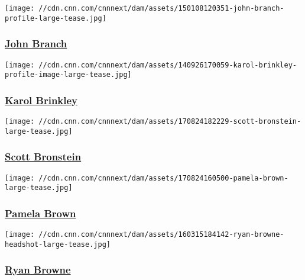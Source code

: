 \href{/profiles/john-branch}{}

\texttt{[image: //cdn.cnn.com/cnnnext/dam/assets/150108120351-john-branch-profile-large-tease.jpg]}

\hypertarget{john-branch}{%
\subsubsection{\texorpdfstring{\href{/profiles/john-branch}{John
Branch}}{John Branch}}\label{john-branch}}

\href{/profiles/karol-brinkley-profile}{}

\texttt{[image: //cdn.cnn.com/cnnnext/dam/assets/140926170059-karol-brinkley-profile-image-large-tease.jpg]}

\hypertarget{karol-brinkley}{%
\subsubsection{\texorpdfstring{\href{/profiles/karol-brinkley-profile}{Karol
Brinkley}}{Karol Brinkley}}\label{karol-brinkley}}

\href{/profiles/scott-bronstein}{}

\texttt{[image: //cdn.cnn.com/cnnnext/dam/assets/170824182229-scott-bronstein-large-tease.jpg]}

\hypertarget{scott-bronstein}{%
\subsubsection{\texorpdfstring{\href{/profiles/scott-bronstein}{Scott
Bronstein}}{Scott Bronstein}}\label{scott-bronstein}}

\href{/profiles/pamela-brown-profile}{}

\texttt{[image: //cdn.cnn.com/cnnnext/dam/assets/170824160500-pamela-brown-large-tease.jpg]}

\hypertarget{pamela-brown}{%
\subsubsection{\texorpdfstring{\href{/profiles/pamela-brown-profile}{Pamela
Brown}}{Pamela Brown}}\label{pamela-brown}}

\href{/profiles/ryan-browne}{}

\texttt{[image: //cdn.cnn.com/cnnnext/dam/assets/160315184142-ryan-browne-headshot-large-tease.jpg]}

\hypertarget{ryan-browne}{%
\subsubsection{\texorpdfstring{\href{/profiles/ryan-browne}{Ryan
Browne}}{Ryan Browne}}\label{ryan-browne}}

